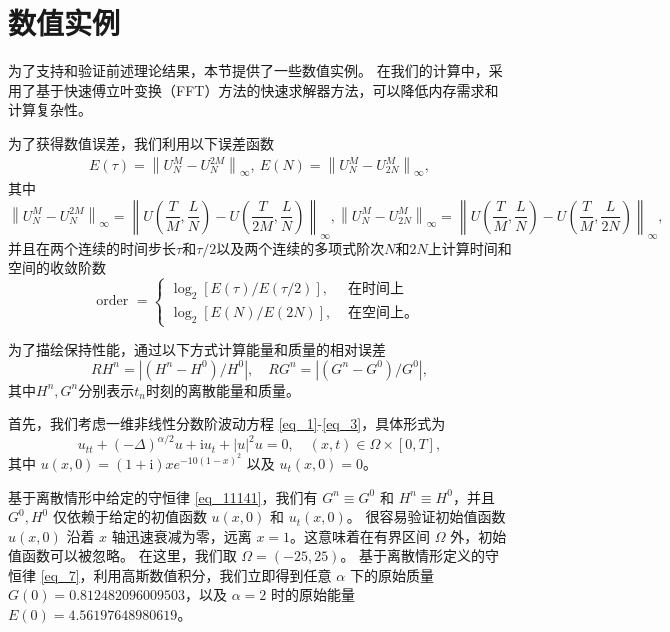 \section{数值实例}\label{Section 4}
为了支持和验证前述理论结果，本节提供了一些数值实例。
在我们的计算中，采用了基于快速傅立叶变换（FFT）方法的快速求解器方法，可以降低内存需求和计算复杂性。

为了获得数值误差，我们利用以下误差函数
\begin{align}\label{eq_103}
E(\tau)=\left\|U_{N}^{M}-U_{N}^{2 M}\right\|_{\infty},~E(N)=\left\|U_{N}^{M}-U_{2 N}^{M}\right\|_{\infty},
\end{align}
其中
$$\left\|U_{N}^{M}-U_{N}^{2 M}\right\|_{\infty}=\left\|U\left(\frac{T}{M}, \frac{L}{N}\right)-U\left(\frac{T}{2 M}, \frac{L}{N}\right)\right\|_{\infty},\left\|U_{N}^{M}-U_{2 N}^{M}\right\|_{\infty}=\left\|U\left(\frac{T}{M}, \frac{L}{N}\right)-U\left(\frac{T}{M}, \frac{L}{2 N}\right)\right\|_{\infty},$$
并且在两个连续的时间步长$\tau$和$\tau / 2$以及两个连续的多项式阶次$N$和$2N$上计算时间和空间的收敛阶数
\begin{equation}
\text { order }= \left\{
\begin{aligned}
\log _{2}[E(\tau) / E(\tau / 2)], & \text { 在时间上 } \\
\log _{2}[E(N) / E(2 N)], & \text { 在空间上。 }
\end{aligned}\right.\label{eq_104}
\end{equation}

为了描绘保持性能，通过以下方式计算能量和质量的相对误差
\begin{equation}\label{eq_105}
R H^{n}=\left|\left(H^{n}-H^{0}\right) / H^{0}\right|, \quad R G^{n}=\left|\left(G^{n}-G^{0}\right) / G^{0}\right|,
\end{equation}
其中$H^{n}, G^{n}$分别表示$t_n$时刻的离散能量和质量。

\begin{example}\label{ex:2}
	首先，我们考虑一维非线性分数阶波动方程 \eqref{eq_1}-\eqref{eq_3}，具体形式为
	\begin{equation}\label{eq_108}
	u_{t t}+(-\Delta)^{\alpha / 2} u+\mathrm{i}u_t+|u|^2 u=0, \quad (x,t)\in  \Omega\times[0, T],
	\end{equation}
	其中 $u(x, 0)=(1+\mathrm{i}) x e^{-10(1-x)^2}$ 以及 $u_t(x, 0)=0$。
\end{example}
	基于离散情形中给定的守恒律 \eqref{eq_11141}，我们有 $G^n\equiv G^0$ 和 $H^n\equiv H^0$，并且 $G^0, H^0$ 仅依赖于给定的初值函数 $u(x,0)$ 和 $u_t(x, 0)$。
	很容易验证初始值函数 $u(x, 0)$ 沿着 $x$ 轴迅速衰减为零，远离 $x=1$。这意味着在有界区间 $\Omega$ 外，初始值函数可以被忽略。 %
	在这里，我们取 $\Omega=(-25,25)$。
	基于离散情形定义的守恒律 \eqref{eq_7}，利用高斯数值积分，我们立即得到任意 $\alpha$ 下的原始质量 $G(0)=0.812482096009503$，以及 $\alpha=2$ 时的原始能量 $E(0)=4.56197648980619$。
	

